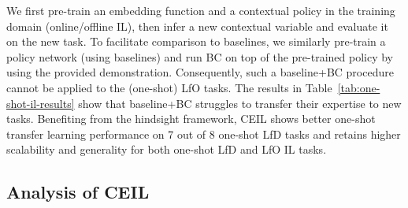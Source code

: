 We first pre-train an embedding function and a contextual policy in the training domain (online/offline IL), then infer a new contextual variable and evaluate it on the new task. To facilitate comparison to baselines, we similarly pre-train a policy network (using baselines) and run BC on top of the pre-trained policy by using the provided demonstration. 
Consequently, such a baseline+BC procedure cannot be applied to the (one-shot) LfO tasks. 
The results in Table~\ref{tab:one-shot-il-results} show that baseline+BC struggles to transfer their expertise to new tasks. 
Benefiting from the hindsight framework, CEIL shows better one-shot transfer learning performance on 7 out of 8 one-shot LfD tasks and retains higher scalability and generality for both one-shot LfD and LfO IL tasks. 


\vspace{-1pt}
\subsection{Analysis of CEIL}
\vspace{-2pt}

